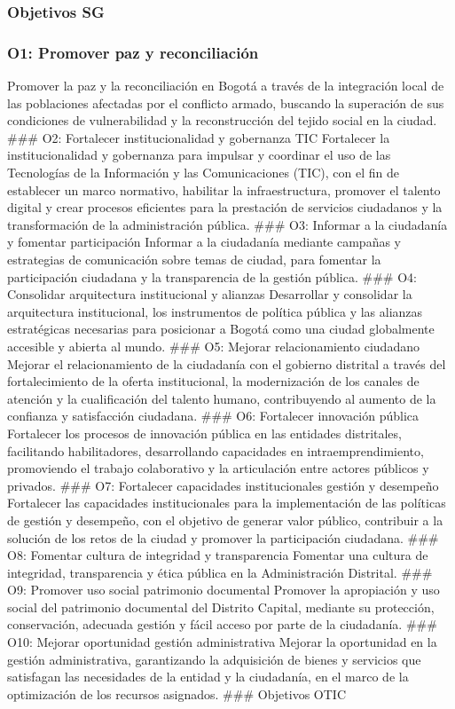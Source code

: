 \documentclass[
	a4paper, %
	12pt, %
]{include/CSSullivanBusinessReport}
\begin{document}
\subsubsection{Objetivos SG}\label{sec:objetivos-sg}

\subsubsection{O1: Promover paz y
reconciliación}\label{sec:o1-promover-paz-y-reconciliaciuxf3n}

Promover la paz y la reconciliación en Bogotá a través de la integración
local de las poblaciones afectadas por el conflicto armado, buscando la
superación de sus condiciones de vulnerabilidad y la reconstrucción del
tejido social en la ciudad. \#\#\# O2: Fortalecer institucionalidad y
gobernanza TIC Fortalecer la institucionalidad y gobernanza para
impulsar y coordinar el uso de las Tecnologías de la Información y las
Comunicaciones (TIC), con el fin de establecer un marco normativo,
habilitar la infraestructura, promover el talento digital y crear
procesos eficientes para la prestación de servicios ciudadanos y la
transformación de la administración pública. \#\#\# O3: Informar a la
ciudadanía y fomentar participación Informar a la ciudadanía mediante
campañas y estrategias de comunicación sobre temas de ciudad, para
fomentar la participación ciudadana y la transparencia de la gestión
pública. \#\#\# O4: Consolidar arquitectura institucional y alianzas
Desarrollar y consolidar la arquitectura institucional, los instrumentos
de política pública y las alianzas estratégicas necesarias para
posicionar a Bogotá como una ciudad globalmente accesible y abierta al
mundo. \#\#\# O5: Mejorar relacionamiento ciudadano Mejorar el
relacionamiento de la ciudadanía con el gobierno distrital a través del
fortalecimiento de la oferta institucional, la modernización de los
canales de atención y la cualificación del talento humano, contribuyendo
al aumento de la confianza y satisfacción ciudadana. \#\#\# O6:
Fortalecer innovación pública Fortalecer los procesos de innovación
pública en las entidades distritales, facilitando habilitadores,
desarrollando capacidades en intraemprendimiento, promoviendo el trabajo
colaborativo y la articulación entre actores públicos y privados. \#\#\#
O7: Fortalecer capacidades institucionales gestión y desempeño
Fortalecer las capacidades institucionales para la implementación de las
políticas de gestión y desempeño, con el objetivo de generar valor
público, contribuir a la solución de los retos de la ciudad y promover
la participación ciudadana. \#\#\# O8: Fomentar cultura de integridad y
transparencia Fomentar una cultura de integridad, transparencia y ética
pública en la Administración Distrital. \#\#\# O9: Promover uso social
patrimonio documental Promover la apropiación y uso social del
patrimonio documental del Distrito Capital, mediante su protección,
conservación, adecuada gestión y fácil acceso por parte de la
ciudadanía. \#\#\# O10: Mejorar oportunidad gestión administrativa
Mejorar la oportunidad en la gestión administrativa, garantizando la
adquisición de bienes y servicios que satisfagan las necesidades de la
entidad y la ciudadanía, en el marco de la optimización de los recursos
asignados. \#\#\# Objetivos OTIC
\end{document}
